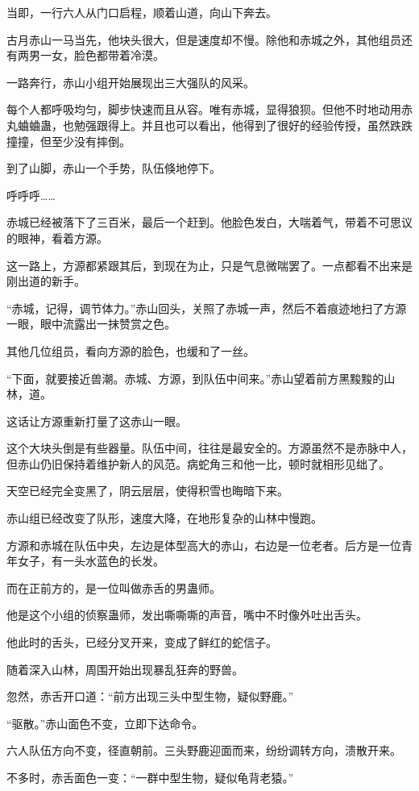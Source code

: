 \begin{this_body}
当即，一行六人从门口启程，顺着山道，向山下奔去。

古月赤山一马当先，他块头很大，但是速度却不慢。除他和赤城之外，其他组员还有两男一女，脸色都带着冷漠。

一路奔行，赤山小组开始展现出三大强队的风采。

每个人都呼吸均匀，脚步快速而且从容。唯有赤城，显得狼狈。但他不时地动用赤丸蛐蛐蛊，也勉强跟得上。并且也可以看出，他得到了很好的经验传授，虽然跌跌撞撞，但至少没有摔倒。

到了山脚，赤山一个手势，队伍倏地停下。

呼呼呼……

赤城已经被落下了三百米，最后一个赶到。他脸色发白，大喘着气，带着不可思议的眼神，看着方源。

这一路上，方源都紧跟其后，到现在为止，只是气息微喘罢了。一点都看不出来是刚出道的新手。

“赤城，记得，调节体力。”赤山回头，关照了赤城一声，然后不着痕迹地扫了方源一眼，眼中流露出一抹赞赏之色。

其他几位组员，看向方源的脸色，也缓和了一丝。

“下面，就要接近兽潮。赤城、方源，到队伍中间来。”赤山望着前方黑黢黢的山林，道。

这话让方源重新打量了这赤山一眼。

这个大块头倒是有些器量。队伍中间，往往是最安全的。方源虽然不是赤脉中人，但赤山仍旧保持着维护新人的风范。病蛇角三和他一比，顿时就相形见绌了。

天空已经完全变黑了，阴云层层，使得积雪也晦暗下来。

赤山组已经改变了队形，速度大降，在地形复杂的山林中慢跑。

方源和赤城在队伍中央，左边是体型高大的赤山，右边是一位老者。后方是一位青年女子，有一头水蓝色的长发。

而在正前方的，是一位叫做赤舌的男蛊师。

他是这个小组的侦察蛊师，发出嘶嘶嘶的声音，嘴中不时像外吐出舌头。

他此时的舌头，已经分叉开来，变成了鲜红的蛇信子。

随着深入山林，周围开始出现暴乱狂奔的野兽。

忽然，赤舌开口道：“前方出现三头中型生物，疑似野鹿。”

“驱散。”赤山面色不变，立即下达命令。

六人队伍方向不变，径直朝前。三头野鹿迎面而来，纷纷调转方向，溃散开来。

不多时，赤舌面色一变：“一群中型生物，疑似龟背老猿。”


\end{this_body}

